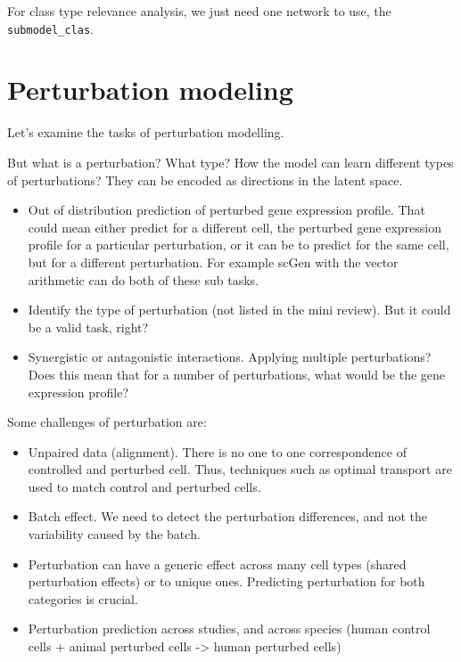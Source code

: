 \documentclass[12pt, a4paper]{article}
\newcommand*{\fullref}[1]{\hyperref[{#1}]{\ref*{#1} \nameref*{#1}}}
\begin{document}
For class type relevance analysis, we just need one network to use, the \verb|submodel_clas|.

\clearpage

\section{Perturbation modeling}


Let's examine the tasks of perturbation modelling.

But what is a perturbation? What type? How the model can learn different types of perturbations? They can be encoded as directions in the latent space.

\begin{itemize}
  \item Out of distribution prediction of perturbed gene expression profile. That could mean either predict for a different cell, the perturbed gene expression profile for a particular perturbation, or it can be to predict for the same cell, but for a different perturbation. For example scGen \cite{lotfollahiScGenPredictsSinglecell2019} with the vector arithmetic can do both of these sub tasks.
  \item Identify the type of perturbation (not listed in the mini review). But it could be a valid task, right?
  \item Synergistic or antagonistic interactions. Applying multiple perturbations? Does this mean that for a number of perturbations, what would be the gene expression profile?
\end{itemize}

Some challenges of perturbation are:

\begin{itemize}
  \item Unpaired data (alignment). There is no one to one correspondence of controlled and perturbed cell. Thus, techniques such as optimal transport are used to match control and perturbed cells.
  \item Batch effect. We need to detect the perturbation differences, and not the variability caused by the batch.
  \item Perturbation can have a generic effect across many cell types (shared perturbation effects) or to unique ones. Predicting perturbation for both categories is crucial.
  \item Perturbation prediction across studies, and across species (human control cells + animal perturbed cells -> human perturbed cells)
\end{itemize}
\end{document}
